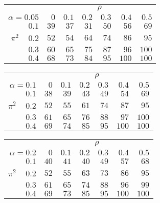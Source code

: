 \begin{tabular}{r|rrrrrr}
\hline\hline
 &\multicolumn{6}{c}{$\rho$} \\ 
 $\alpha = 0.05$ & $0$ & $0.1$ & $0.2$ & $0.3$ & $0.4$ & $0.5$ \\ 
 \hline$0.1$ & $ 39$ & $ 37$ & $ 31$ & $ 50$ & $ 56$ & $ 69$\\ 
$\pi^2\;\;\;$ $0.2$ & $ 52$ & $ 54$ & $ 64$ & $ 74$ & $ 86$ & $ 95$\\ 
$0.3$ & $ 60$ & $ 65$ & $ 75$ & $ 87$ & $ 96$ & $100$\\ 
$0.4$ & $ 68$ & $ 73$ & $ 84$ & $ 95$ & $100$ & $100$\\ 
 \hline 
 \end{tabular}
 
 \vspace{2em} 
 
\begin{tabular}{r|rrrrrr}
\hline\hline
 &\multicolumn{6}{c}{$\rho$} \\ 
 $\alpha = 0.1$ & $0$ & $0.1$ & $0.2$ & $0.3$ & $0.4$ & $0.5$ \\ 
 \hline$0.1$ & $ 38$ & $ 39$ & $ 43$ & $ 49$ & $ 54$ & $ 69$\\ 
$\pi^2\;\;\;$ $0.2$ & $ 52$ & $ 55$ & $ 61$ & $ 74$ & $ 87$ & $ 95$\\ 
$0.3$ & $ 61$ & $ 65$ & $ 76$ & $ 88$ & $ 97$ & $100$\\ 
$0.4$ & $ 69$ & $ 74$ & $ 85$ & $ 95$ & $100$ & $100$\\ 
 \hline 
 \end{tabular}
 
 \vspace{2em} 
 
\begin{tabular}{r|rrrrrr}
\hline\hline
 &\multicolumn{6}{c}{$\rho$} \\ 
 $\alpha = 0.2$ & $0$ & $0.1$ & $0.2$ & $0.3$ & $0.4$ & $0.5$ \\ 
 \hline$0.1$ & $ 40$ & $ 41$ & $ 40$ & $ 49$ & $ 57$ & $ 68$\\ 
$\pi^2\;\;\;$ $0.2$ & $ 52$ & $ 55$ & $ 63$ & $ 73$ & $ 86$ & $ 95$\\ 
$0.3$ & $ 61$ & $ 65$ & $ 74$ & $ 88$ & $ 96$ & $ 99$\\ 
$0.4$ & $ 69$ & $ 73$ & $ 85$ & $ 95$ & $100$ & $100$\\ 
 \hline 
 \end{tabular}